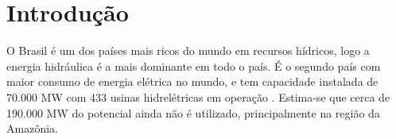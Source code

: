 \section{Introdução}
O Brasil é um dos países mais ricos do mundo em recursos hídricos, logo a
energia hidráulica é a mais dominante em todo o país. É o segundo país
com maior consumo de energia elétrica no mundo, e tem capacidade instalada de
70.000 MW com 433 usinas hidrelétricas em
operação \citep{goldemberg2007energia}. Estima-se que cerca de 190.000 MW do
potencial ainda não é utilizado, principalmente na região da Amazônia.
